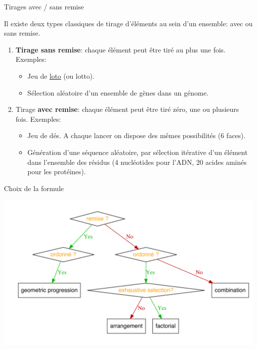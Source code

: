\documentclass[ignorenonframetext,]{beamer}
\providecommand{\tightlist}{%
  \setlength{\itemsep}{0pt}\setlength{\parskip}{0pt}}
\begin{document}
\begin{frame}{Tirages avec / sans remise}
\protect\hypertarget{tirages-avec-sans-remise}{}

Il existe deux types classiques de tirage d'éléments au sein d'un
ensemble: avec ou sans remise.

\begin{enumerate}
\item
  \textbf{Tirage sans remise}: chaque élément peut être tiré au plus une
  fois. Exemples:

  \begin{itemize}
  \tightlist
  \item
    Jeu de \href{https://fr.wikipedia.org/wiki/Loto}{loto} (ou lotto).
  \item
    Sélection aléatoire d'un ensemble de gènes dans un génome.
  \end{itemize}
\item
  Tirage \textbf{avec remise}: chaque élément peut être tiré zéro, une
  ou plusieurs fois. Exemples:

  \begin{itemize}
  \tightlist
  \item
    Jeu de dés. A chaque lancer on dispose des mêmes possibilités (6
    faces).
  \item
    Génération d'une séquence aléatoire, par sélection itérative d'un
    élément dans l'ensemble des résidus (4 nucléotides pour l'ADN, 20
    acides aminés pour les protéines).
  \end{itemize}
\end{enumerate}

\end{frame}

\begin{frame}{Choix de la formule}
\protect\hypertarget{choix-de-la-formule}{}

\begin{center}\includegraphics[width=0.9\linewidth]{figures/02_combinatorics_combinatorix_flowchart-1} \end{center}

\end{frame}
\end{document}
